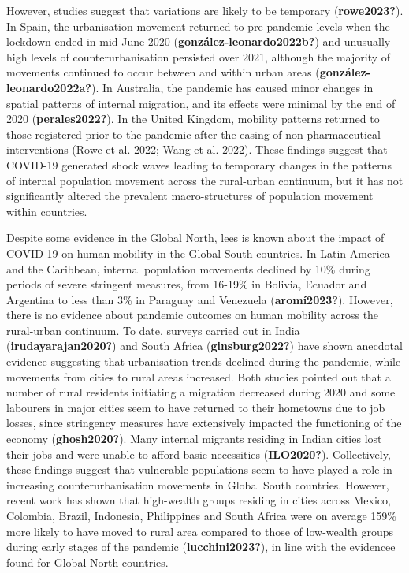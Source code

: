 \documentclass[11pt,letterpaper]{article}
\begin{document}
However, studies suggest that variations are likely to be temporary
(\textbf{rowe2023?}). In Spain, the urbanisation movement returned to
pre-pandemic levels when the lockdown ended in mid-June 2020
(\textbf{gonzález-leonardo2022b?}) and unusually high levels of
counterurbanisation persisted over 2021, although the majority of
movements continued to occur between and within urban areas
(\textbf{gonzález-leonardo2022a?}). In Australia, the pandemic has
caused minor changes in spatial patterns of internal migration, and its
effects were minimal by the end of 2020 (\textbf{perales2022?}). In the
United Kingdom, mobility patterns returned to those registered prior to
the pandemic after the easing of non-pharmaceutical interventions (Rowe
et al. 2022; Wang et al. 2022). These findings suggest that COVID-19
generated shock waves leading to temporary changes in the patterns of
internal population movement across the rural-urban continuum, but it
has not significantly altered the prevalent macro-structures of
population movement within countries.

Despite some evidence in the Global North, lees is known about the
impact of COVID-19 on human mobility in the Global South countries. In
Latin America and the Caribbean, internal population movements declined
by 10\% during periods of severe stringent measures, from 16-19\% in
Bolivia, Ecuador and Argentina to less than 3\% in Paraguay and
Venezuela (\textbf{aromí2023?}). However, there is no evidence about
pandemic outcomes on human mobility across the rural-urban continuum. To
date, surveys carried out in India (\textbf{irudayarajan2020?}) and
South Africa (\textbf{ginsburg2022?}) have shown anecdotal evidence
suggesting that urbanisation trends declined during the pandemic, while
movements from cities to rural areas increased. Both studies pointed out
that a number of rural residents initiating a migration decreased during
2020 and some labourers in major cities seem to have returned to their
hometowns due to job losses, since stringency measures have extensively
impacted the functioning of the economy (\textbf{ghosh2020?}). Many
internal migrants residing in Indian cities lost their jobs and were
unable to afford basic necessities (\textbf{ILO2020?}). Collectively,
these findings suggest that vulnerable populations seem to have played a
role in increasing counterurbanisation movements in Global South
countries. However, recent work has shown that high-wealth groups
residing in cities across Mexico, Colombia, Brazil, Indonesia,
Philippines and South Africa were on average 159\% more likely to have
moved to rural area compared to those of low-wealth groups during early
stages of the pandemic (\textbf{lucchini2023?}), in line with the
evidencee found for Global North countries.
\end{document}

